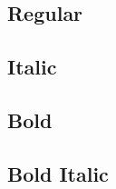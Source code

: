\documentclass{article}
\begin{document}
\cabincondensed

\subsection*{Regular}
\lipsum[1]

\subsection*{Italic}
\textit{\lipsum[2]}

\subsection*{Bold}

\textbf{\lipsum[3]}



\subsection*{Bold Italic}

\textbf{\textit{\lipsum[4]}}
\end{document}
